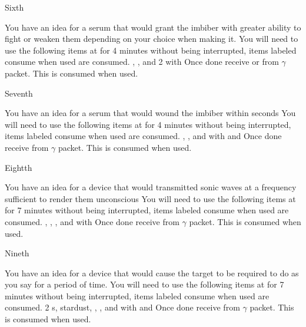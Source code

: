 \documentclass[greennotebook]{guildcamp3} %
\begin{document}
\begin{page}{Sixth}
	
	You have an idea for a serum that would grant the imbiber with greater ability to fight or weaken them depending on your choice when making it.
	You will need to use the following items at \sSciWorkbench{} for 4 minutes without being interrupted, items labeled consume when used are consumed.
	\iCompoundNine{}, \iUnicornHoof{}, and 2 \iScrapMetal{} with \iMultitool{}
	Once done receive \iCRUpSerum{} or \iCRDownSerum{} from $\gamma$ packet. This is consumed when used. 
	
\end{page}

\begin{page}{Seventh}
	
	You have an idea for a serum that would wound the imbiber within seconds
	You will need to use the following items at \sSciWorkbench{} for 4 minutes without being interrupted, items labeled consume when used are consumed.
	\iCompoundNine{}, \iBloodPlasma{}, and \iBelladonna{} with \iCentrifuge{} and \iTestTube{}
	Once done receive \iTechPoison{} from $\gamma$ packet. This is consumed when used. 
	
\end{page}

\begin{page}{Eightth}
	
	You have an idea for a device that would transmitted sonic waves at a frequency sufficient to render them unconscious
	You will need to use the following items at \sSciWorkbench{} for 7 minutes without being interrupted, items labeled consume when used are consumed.
	\iCompoundNine{}, \iOil{}, \iWerewolfFang{}, \iGraphiteLube and \iBelladonna{} with \iLeadPipe{}
	Once done receive \iSonicKO{} from $\gamma$ packet. This is consumed when used. 
	
\end{page}

\begin{page}{Nineth}
	
	You have an idea for a device that would cause the target to be required to do as you say for a period of time.
	You will need to use the following items at \sSciWorkbench{} for 7 minutes without being interrupted, items labeled consume when used are consumed.
	2 \iTransistor{}s, stardust, \iCircuitBoard{}, \iCog{}, and \iGraphiteLube with \iDiamondDrill{} and \iMonoBlade{}
	Once done receive \iMCDevice{} from $\gamma$ packet. This is consumed when used. 
	
\end{page}
\end{document}
